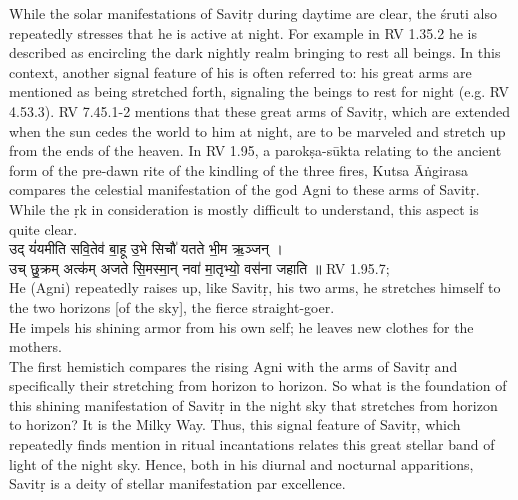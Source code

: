 \documentclass[12pt]{article}
\begin{document}
While the solar manifestations of Savitṛ during daytime are clear, the śruti also repeatedly stresses that he is active at night. For example in RV 1.35.2 he is described as encircling the dark nightly realm bringing to rest all beings. In this context, another signal feature of his is often referred to: his great arms are mentioned as being stretched forth, signaling the beings to rest for night (e.g. RV 4.53.3). RV 7.45.1-2 mentions that these great arms of Savitṛ, which are extended when the sun cedes the world to him at night, are to be marveled and stretch up from the ends of the heaven. In RV 1.95, a parokṣa-sūkta relating to the ancient form of the pre-dawn rite of the kindling of the three fires, Kutsa Āṅgirasa compares the celestial manifestation of the god Agni to these arms of Savitṛ. While the ṛk in consideration is mostly difficult to understand, this aspect is quite clear.\\[8pt]
{\skt उद् यं॑यमीति सवि॒तेव॑ बा॒हू उ॒भे सिचौ॑ यतते भी॒म ऋ॒ञ्जन् ।\\
उच् छु॒क्रम् अत्क॑म् अजते सि॒मस्मा॒न् नवा॑ मा॒तृभ्यो॒ वस॑ना जहाति ॥
} RV 1.95.7; \\[8pt]

He (Agni) repeatedly raises up, like Savitṛ, his two arms, he stretches himself to the two horizons [of the sky], the fierce straight-goer.\\
He impels his shining armor from his own self; he leaves new clothes for the mothers.\\[8pt]
The first hemistich compares the rising Agni with the arms of Savitṛ and specifically their stretching from horizon to horizon. So what is the foundation of this shining manifestation of Savitṛ in the night sky that stretches from horizon to horizon? It is the Milky Way. Thus, this signal feature of Savitṛ, which repeatedly finds mention in ritual incantations relates this great stellar band of light of the night sky. Hence, both in his diurnal and nocturnal apparitions, Savitṛ is a deity of stellar manifestation par excellence.
\end{document}
